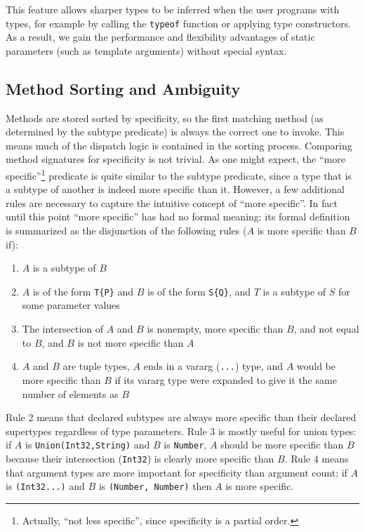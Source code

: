 \documentclass[9pt]{sigplanconf}
\begin{document}
This feature allows sharper types to be inferred when the user programs
with types, for example by calling the {\tt typeof} function or applying
type constructors. As a result, we gain the performance and flexibility
advantages of static parameters (such as template arguments) without special
syntax.

\subsection{Method Sorting and Ambiguity}
Methods are stored sorted by specificity, so the first matching method
(as determined by the subtype predicate) is always the correct one to invoke.
This means much of the dispatch logic is contained in the sorting process.
Comparing method signatures for specificity is not trivial. As one might
expect, the ``more specific''\footnote{Actually, ``not less specific'',
since specificity is a partial order.}
predicate is quite similar to the subtype
predicate, since a type that is a subtype of another is indeed more specific
than it. However, a few additional rules are necessary to capture the
intuitive concept of ``more specific''. In fact until this point
``more specific'' has had no formal meaning; its formal definition is
summarized as the disjunction of the following rules ($A$ is more specific
than $B$ if):

\begin{enumerate}
\item $A$ is a subtype of $B$
\item $A$ is of the form {\tt T\{P\}} and $B$ is of the form {\tt S\{Q\}}, and
$T$ is a subtype of $S$ for some parameter values
\item The intersection of $A$ and $B$ is nonempty, more specific than $B$, and
not equal to $B$, and $B$ is not more specific than $A$
\item $A$ and $B$ are tuple types, $A$ ends in a vararg ({\tt ...}) type,
and $A$ would be more specific than $B$ if its vararg type were expanded to
give it the same number of elements as $B$
\end{enumerate}

Rule 2 means that declared subtypes are always more specific than their
declared supertypes regardless of type parameters. Rule 3 is mostly useful for
union types: if $A$ is {\tt Union(Int32,String)} and $B$ is {\tt Number}, $A$
should
be more specific than $B$ because their intersection ({\tt Int32}) is clearly
more specific than $B$. Rule 4 means that argument types are more important for
specificity than argument count; if $A$ is {\tt (Int32...)} and $B$ is
{\tt (Number, Number)} then $A$ is more specific.
\end{document}
